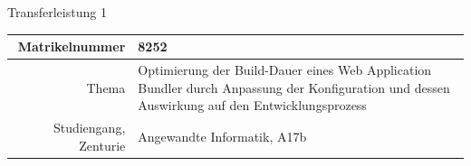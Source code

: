 \documentclass[11pt]{report}
\begin{document}
    {\huge Transferleistung 1}
    \vspace{1cm}

    \begin{center}
        \begin{tabularx}{\textwidth}{r|X}
            Matrikelnummer & 8252 \\\midrule
            Thema & Optimierung der Build-Dauer eines Web Application Bundler durch Anpassung der Konfiguration und dessen Auswirkung auf den Entwicklungsprozess \\\midrule %
            Studiengang, Zenturie & Angewandte Informatik, A17b\
        \end{tabularx}
    \end{center}
    \pagebreak

    \tableofcontents
    \listoffigures
    \listoftables
    \pagebreak

\end{document}
